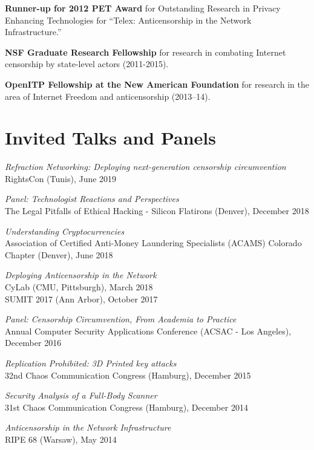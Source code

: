 \documentclass[margin,11pt]{res} %
\begin{document}
    \textbf{Runner-up for 2012 PET Award} for Outstanding Research in Privacy Enhancing Technologies for ``Telex: Anticensorship in the Network Infrastructure.''


    \textbf{NSF Graduate Research Fellowship}
    for research in combating Internet censorship by state-level actors (2011-2015).
    
    \textbf{OpenITP Fellowship at the New American Foundation}
    for research in the area of Internet Freedom and anticensorship (2013--14).

\vspace{6pt}
\section{\large Invited Talks and Panels}

\emph{Refraction Networking: Deploying next-generation censorship circumvention} \\
    RightsCon (Tunis), June 2019

\emph{Panel: Technologist Reactions and Perspectives} \\
    The Legal Pitfalls of Ethical Hacking - Silicon Flatirons (Denver), December 2018

\emph{Understanding Cryptocurrencies} \\
    Association of Certified Anti-Money Laundering Specialists (ACAMS) Colorado Chapter (Denver), June 2018

\emph{Deploying Anticensorship in the Network} \\
    CyLab (CMU, Pittsburgh), March 2018 \\
    SUMIT 2017 (Ann Arbor), October 2017

\emph{Panel: Censorship Circumvention, From Academia to Practice} \\
    Annual Computer Security Applications Conference (ACSAC - Los Angeles), December 2016

\emph{Replication Prohibited: 3D Printed key attacks} \\
    32nd Chaos Communication Congress (Hamburg), December 2015

\emph{Security Analysis of a Full-Body Scanner} \\
    31st Chaos Communication Congress (Hamburg), December 2014

\emph{Anticensorship in the Network Infrastructure} \\
    RIPE 68 (Warsaw), May 2014
\end{document}

